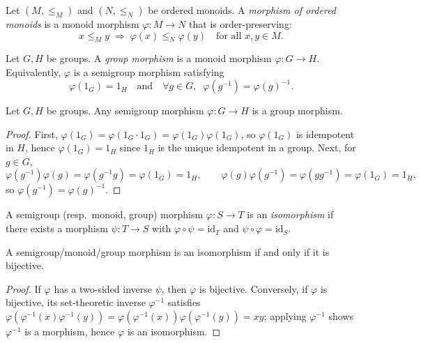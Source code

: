 \begin{definition}
\label{def:ordered-monoid-morphism}
Let \((M,\le_M)\) and \((N,\le_N)\) be ordered monoids. A \emph{morphism of ordered monoids} is a monoid morphism \(\varphi:M\to N\) that is order-preserving:
\[
x\le_M y \;\Longrightarrow\; \varphi(x)\le_N \varphi(y)\quad\text{for all }x,y\in M.
\]
\end{definition}

\begin{definition}
\label{def:group-morphism}
Let \(G,H\) be groups. A \emph{group morphism} is a monoid morphism \(\varphi:G\to H\). Equivalently, \(\varphi\) is a semigroup morphism satisfying
\[
\varphi(1_G)=1_H\quad\text{and}\quad \forall g\in G,\;\; \varphi(g^{-1})=\varphi(g)^{-1}.
\]
\end{definition}

\begin{lemma}
\label{lem:sgp-mor-between-groups-are-group-mor}
Let \(G,H\) be groups. Any semigroup morphism \(\varphi:G\to H\) is a group morphism.
\end{lemma}
\begin{proof}
First, \(\varphi(1_G)=\varphi(1_G\cdot 1_G)=\varphi(1_G)\varphi(1_G)\), so \(\varphi(1_G)\) is idempotent in \(H\), hence \(\varphi(1_G)=1_H\) since \(1_H\) is the unique idempotent in a group. Next, for \(g\in G\),
\[
\varphi(g^{-1})\varphi(g)=\varphi(g^{-1}g)=\varphi(1_G)=1_H,\qquad
\varphi(g)\varphi(g^{-1})=\varphi(gg^{-1})=\varphi(1_G)=1_H,
\]
so \(\varphi(g^{-1})=\varphi(g)^{-1}\).
\end{proof}

\begin{definition}[Isomorphism]
\label{def:isomorphism}
A semigroup (resp.\ monoid, group) morphism \(\varphi:S\to T\) is an \emph{isomorphism} if there exists a morphism \(\psi:T\to S\) with \(\varphi\circ \psi=\mathrm{id}_T\) and \(\psi\circ \varphi=\mathrm{id}_S\).
\end{definition}

\begin{lemma}
\label{lem:iso-iff-bijective}
A semigroup/monoid/group morphism is an isomorphism if and only if it is bijective.
\end{lemma}
\begin{proof}
If \(\varphi\) has a two-sided inverse \(\psi\), then \(\varphi\) is bijective. Conversely, if \(\varphi\) is bijective, its set-theoretic inverse \(\varphi^{-1}\) satisfies \(\varphi(\varphi^{-1}(x)\varphi^{-1}(y))=\varphi(\varphi^{-1}(x))\varphi(\varphi^{-1}(y))=xy\); applying \(\varphi^{-1}\) shows \(\varphi^{-1}\) is a morphism, hence \(\varphi\) is an isomorphism.
\end{proof}

